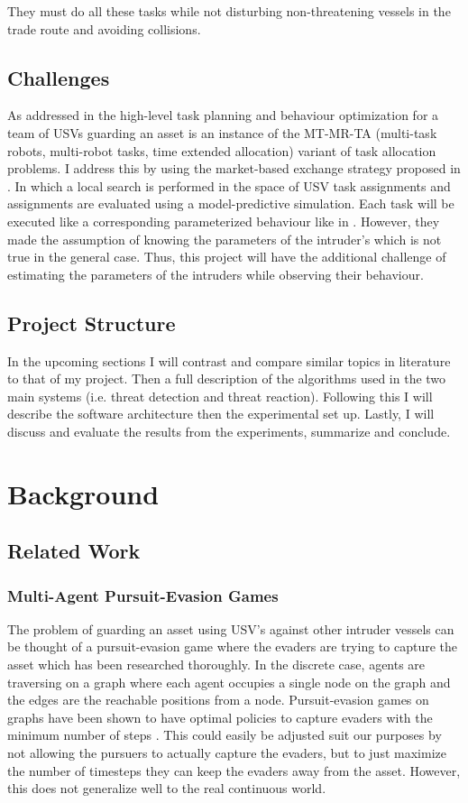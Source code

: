 \documentclass[bsc,frontabs,twoside,singlespacing,parskip,deptreport]{infthesis}     %
\begin{document}
They must do all these tasks while not disturbing non-threatening vessels in the trade route and avoiding collisions.

\section{Challenges}
As addressed in \cite{raboin2013model} the high-level task planning and behaviour optimization for a team of USVs guarding an asset is an instance of the MT-MR-TA (multi-task robots, multi-robot tasks, time extended allocation) variant of task allocation problems. I address this by using the market-based exchange strategy proposed in \cite{raboin2013model}. In which a local search is performed in the space of USV task assignments and assignments are evaluated using a model-predictive simulation. Each task will be executed like a corresponding parameterized behaviour like in \cite{raboin2013model}. However, they made the assumption of knowing the parameters of the intruder's which is not true in the general case. Thus, this project will have the additional challenge of estimating the parameters of the intruders while observing their behaviour.

\section{Project Structure}
In the upcoming sections I will contrast and compare similar topics in literature to that of my project. Then a full description of the algorithms used in the two main systems (i.e. threat detection and threat reaction). Following this I will describe the software architecture then the experimental set up. Lastly, I will discuss and evaluate the results from the experiments, summarize and conclude.

\chapter{Background}

\section{Related Work}

\subsection{Multi-Agent Pursuit-Evasion Games}
The problem of guarding an asset using USV’s against other intruder vessels can be thought of a pursuit-evasion game where the evaders are trying to capture the asset which has been researched thoroughly. In the discrete case, agents are traversing on a graph where each agent occupies a single node on the graph and the edges are the reachable positions from a node. Pursuit-evasion games on graphs have been shown to have optimal policies to capture evaders with the minimum number of steps \cite{vieira2008optimal}. This could easily be adjusted suit our purposes by not allowing the pursuers to actually capture the evaders, but to just maximize the number of timesteps they can keep the evaders away from the asset. However, this does not generalize well to the real continuous world.
\end{document}
